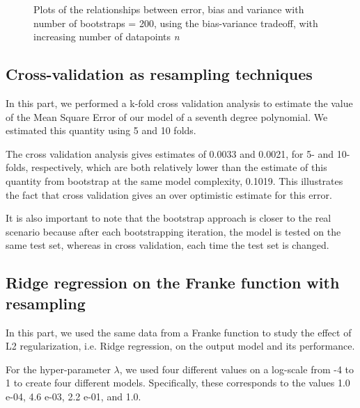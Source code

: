 \documentclass{article}
\begin{document}
\begin{figure}[h]\centering
{}\hfill
{} \par
{}
\caption{Plots of the relationships between error, bias and variance with number of bootstraps = 200, using the bias-variance tradeoff, with increasing number of datapoints \textit{n}}
\label{fig}
\end{figure}





\subsection{Cross-validation as resampling techniques}
In this part, we performed a k-fold cross validation analysis to estimate the value of the Mean Square Error of our model of a seventh degree polynomial. We estimated this quantity using 5 and 10 folds.

The cross validation analysis gives estimates of 0.0033 and 0.0021, for 5- and 10-folds, respectively, which are both relatively lower than the estimate of this quantity from bootstrap at the same model complexity, 0.1019. This illustrates the fact that cross validation gives an over optimistic estimate for this error.

It is also important to note that the bootstrap approach is closer to the real scenario because after each bootstrapping iteration, the model is tested on the same test set, whereas in cross validation, each time the test set is changed.

\clearpage
\subsection{Ridge regression on the Franke function with resampling}
In this part, we used the same data from a Franke function to study the effect of L2 regularization, i.e. Ridge regression, on the output model and its performance.

For the hyper-parameter $\lambda$, we used four different values on a log-scale from -4 to 1 to create four different models. Specifically, these corresponds to the values 1.0 e-04, 4.6 e-03, 2.2 e-01, and 1.0.
\end{document}
